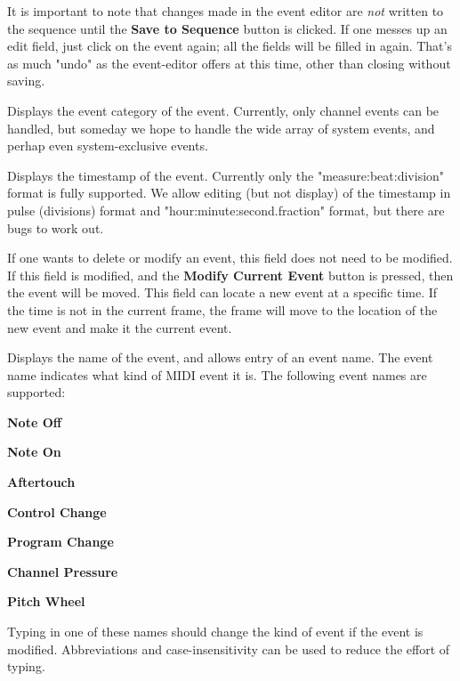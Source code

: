    It is important to note that changes made in the event editor
   are \textsl{not} written to the sequence until the \textbf{Save to Sequence}
   button is clicked.  If one messes up an edit field, just click on the event
   again; all the fields will be filled in again.
   That's as much "undo" as the event-editor offers at this time, other than
   closing without saving.

   \setcounter{ItemCounter}{0}      %

   Displays the event category of the event.  Currently, only channel events
   can be handled, but someday we hope to handle the wide array of system
   events, and perhap even system-exclusive events.

   Displays the timestamp of the event.  Currently only the
   "measure:beat:division" format is fully supported.
   We allow editing (but not display) of the timestamp in
   pulse (divisions) format and "hour:minute:second.fraction" format, but
   there are bugs to work out.

   If one wants to delete or modify an event, this field does not need to be
   modified.  If this field is modified, and the \textbf{Modify Current Event}
   button is pressed, then the event will be moved.  This field can locate
   a new event at a specific time.  If the time is not in the current frame,
   the frame will move to the location of the new event and make it the current
   event.

   Displays the name of the event, and allows entry of an event name.
   The event name indicates what kind of MIDI event it is. 
   The following event names are supported:

   \begin{enumber}
      \item \textbf{Note Off}
      \item \textbf{Note On}
      \item \textbf{Aftertouch}
      \item \textbf{Control Change}
      \item \textbf{Program Change}
      \item \textbf{Channel Pressure}
      \item \textbf{Pitch Wheel}
   \end{enumber}

   Typing in one of these names should change the kind of event if the event is
   modified.  Abbreviations and case-insensitivity can be used to reduce the
   effort of typing.

